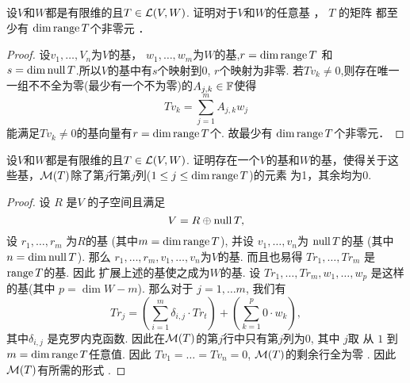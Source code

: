 \begin{problem}{1}
设$V$和$W$都是有限维的且$T\in\mathcal{L}(V,W)$.
证明对于$ V $和$ W $的任意基 ，
$T$ 的矩阵
都至少有 $\dim\operatorname{range} T $个非零元 ．
\end{problem}
\begin{proof}
	设$v_1,\dots,V_n$为$V$的基，
	$w_1,\dots,w_m$为$W$的基,$r=\dim \operatorname{range} T$ 和
	$s = \dim \operatorname{null} T$.所以$V$的基中有$s$个映射到$0$,
	$r$个映射为非零.
	若$Tv_k\neq 0 $,则存在唯一一组不不全为零(最少有一个不为零)的$A_{j,k}\in \mathbb{F}$使得
	\[
		Tv_k = \displaystyle\sum_{j=1}^{m}A_{j,k}w_j
	\]
	能满足$Tv_k\neq 0 $的基向量有$r=\dim \operatorname{range} T$个.
	故最少有 $\dim\operatorname{range} T $个非零元．

\end{proof}

\begin{problem}{3}
设$V$和$W$都是有限维的且$T\in\mathcal{L}(V,W)$.
证明存在一个$V$的基和$W$的基，使得关于这
些基，$\mathcal{M}(T)$除了第$j$行第$j$列($1\leq j \leq \dim \operatorname{range} T$)的元素
为1，其余均为0.
\end{problem}
\begin{proof}
	设 $R$ 是$V$ 的子空间且满足
	\begin{equation*}
		V = R\oplus \operatorname{null} T,
	\end{equation*}
	设 $r_1,\dots, r_m$ 为$R$的基 (其中$m =\dim\operatorname{range} T$),
	并设 $v_1,\dots, v_n$为 $\operatorname{null} T$的基  (其中 $n = \dim\operatorname{null} T$).
	那么 $r_1,\dots, r_m, v_1,\dots,v_n$为$V$的基.
	而且也易得 $Tr_1,\dots, Tr_m$ 是 $\operatorname{range} T$的基.
	因此 扩展上述的基使之成为$W$的基.
	设 $Tr_1,\dots, Tr_m, w_1,\dots, w_p$ 是这样的基(其中 $p = \dim W - m$).
	那么对于 $j = 1,\dots m$, 我们有
	\begin{equation*}
		Tr_j = \left(\sum_{i = 1}^m\delta_{i,j}\cdot Tr_t\right) + \left(\sum_{k = 1}^p 0\cdot w_k\right),
	\end{equation*}
	其中$\delta_{i,j}$ 是克罗内克函数.
	因此在$\mathcal{M}(T)$的第$j$行中只有第$j$列为$0$,
	其中 $j$取 从 $1$ 到 $m = \dim\operatorname{range} T$任意值.
	因此 $Tv_1 = \dots = Tv_n = 0$,
	$\mathcal{M}(T)$的剩余行全为零 .
	因此 $\mathcal{M}(T)$有所需的形式 .
\end{proof}

